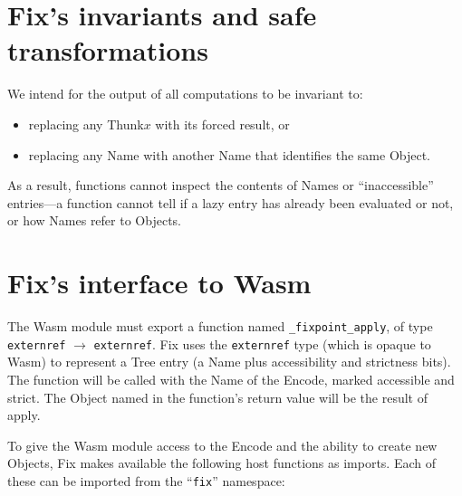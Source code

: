 \documentclass{article}
\newcommand{\object}{\textrm{Object}\xspace}
\newcommand{\objects}{\textrm{Object}s\xspace}
\newcommand{\encode}{\textrm{Encode}\xspace}
\newcommand{\thunk}{\textrm{Thunk}\xspace}
\newcommand{\name}{\textrm{Name}\xspace}
\newcommand{\names}{\textrm{Name}s\xspace}
\newcommand{\tree}{\textrm{Tree}\xspace}
\newcommand{\bs}{\vspace{\baselineskip}}
\newcommand{\apply}{\textsf{apply}}
\begin{document}
\section{Fix's invariants and safe transformations}

We intend for the output of all computations to be invariant to:

\begin{itemize}[itemsep=0pt]

\item replacing any \thunk $x$ with its forced result, or

\item replacing any \name with another \name that identifies the same \object.

\end{itemize}

As a result, functions cannot inspect the contents of \names or
``inaccessible'' entries---a function cannot tell if a lazy entry has
already been evaluated or not, or how \names refer to \objects.

\section{Fix's interface to Wasm}
\label{s:imports}

The Wasm module must export a function named {\tt \_fixpoint\_apply},
of type \texttt{externref} $\rightarrow$ \texttt{externref}. Fix uses
the \texttt{externref} type (which is opaque to Wasm) to represent a
\tree entry (a \name plus accessibility and strictness bits). The
function will be called with the \name of the \encode, marked
accessible and strict. The \object named in the function's return
value will be the result of \apply.

\bs

To give the Wasm module access to the \encode and the ability to
create new \objects, Fix makes available the following host functions
as imports. Each of these can be imported from the ``\texttt{fix}'' namespace:
\end{document}
